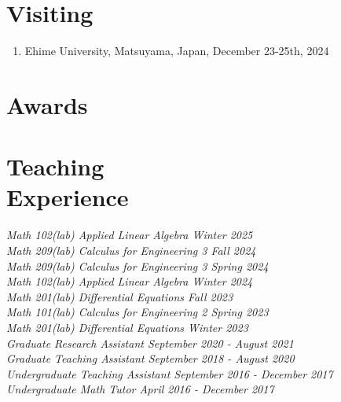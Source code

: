 \documentclass[margin]{res}
\begin{document}
\begin{resume}
\section{Visiting}
\begin{enumerate}
    \item Ehime University, Matsuyama, Japan, December 23-25th, 2024
\end{enumerate}


\section{Awards}


\section{Teaching\\Experience}

\textsl{Math 102(lab) Applied Linear Algebra \hfill{Winter 2025}\\}
\textsl{Math 209(lab) Calculus for Engineering 3 \hfill{Fall 2024}\\}
\textsl{Math 209(lab) Calculus for Engineering 3 \hfill{Spring 2024}\\}
\textsl{Math 102(lab) Applied Linear Algebra \hfill{Winter 2024}\\}
\textsl{Math 201(lab) Differential Equations \hfill{Fall 2023}\\}
\textsl{Math 101(lab) Calculus for Engineering 2 \hfill{Spring 2023}\\}
\textsl{Math 201(lab) Differential Equations \hfill{Winter 2023}\\}
\textsl{Graduate Research Assistant \hfill{September 2020 - August 2021}\\}
\textsl{Graduate Teaching Assistant \hfill{September 2018 - August 2020}\\}
\textsl{Undergraduate Teaching Assistant \hfill{September 2016 - December 2017}\\}
\textsl{Undergraduate Math Tutor \hfill{April 2016 - December 2017}\\}






\end{resume}
\(\)
\end{document}
